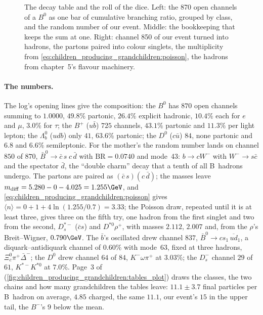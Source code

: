 \begin{figure}[htbp]\centering
\resizebox{\textwidth}{!}{}
\caption[The decay table as a bar, the  bookkeeping and a
partonic channel turned into hadrons]{The decay table and the roll of the
dice. Left: the 870 open channels of a $B^0$ as one bar of cumulative
branching ratio, grouped by class, and the random number of our event.
Middle: the  bookkeeping that keeps the sum at one. Right:
channel 850 of our event turned into hadrons, the partons paired into
colour singlets, the multiplicity from
\cref{eq:children_producing_grandchildren:poisson}, the hadrons from
chapter~5's flavour machinery.}
\label{fig:children_producing_grandchildren:tables_sketch}
\end{figure}

\paragraph{The numbers.} The log's opening lines give the composition:
the $B^0$ has $870$ open channels summing to $1.0000$, $49.8\%$ partonic,
$26.4\%$ explicit hadronic, $10.4\%$ each for $e$ and $\mu$, $3.0\%$ for
$\tau$; the $B^+$ ($u\bar b$) $725$ channels, $43.1\%$ partonic and
$11.3\%$ per light lepton; the $\Lambda_b^0$ ($udb$) only $41$, $63.6\%$
partonic; the $D^0$ ($c\bar u$) $84$, none partonic and $6.8$ and $6.6\%$
semileptonic. For the mother's \Bbar the random number lands on channel
$850$ of $870$, $\bar B^0\to\bar c\,s\;c\,\bar d$ with $\mathrm{BR}=0.0740$
and mode~43: $b\to cW^-$ with $W^-\to s\bar c$ and the spectator $\bar d$,
the ``double charm'' decay that a tenth of all B~hadrons undergo. The
partons are paired as $(\bar c\,s)(c\,\bar d)$; the masses leave
$m_{\mathrm{diff}}=5.280-0-4.025=1.255\GeV$, and
\cref{eq:children_producing_grandchildren:poisson} gives
$\langle n\rangle=0+1+4\ln(1.255/0.7)=3.33$; the Poisson draw, repeated
until it is at least three, gives three on the fifth try, one hadron from
the first singlet and two from the second, $D_s^{*-}$ ($\bar cs$) and
$D^{*0}\rho^+$, with masses $2.112$, $2.007$ and, from the $\rho$'s
Breit--Wigner, $0.790\GeV$.
The $\bar b$'s oscillated \Bbar drew channel $837$, $\bar B^0\to cs_1\,\overline{ud}_1$,
a diquark--antidiquark channel of $0.60\%$ with mode~63, fixed at three
hadrons, $\Xi_c^0\pi^+\bar\Delta^-$; the $D^0$ drew channel $64$ of $84$,
$K^-\omega\pi^+$ at $3.03\%$; the $D_s^-$ channel $29$ of $61$,
$K^{*-}K^{*0}$ at $7.0\%$. Page~3 of 
(\cref{fig:children_producing_grandchildren:tables_plot}) draws the
classes, the two chains and how many grandchildren the tables leave:
$11.1\pm3.7$ final particles per B~hadron on average, $4.85$ charged,
\PYTHIA the same $11.1$, our event's $15$ in the upper tail, the \CMSSW
$B^-$'s $9$ below the mean.

